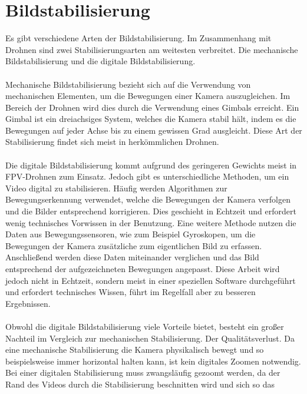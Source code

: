 
\section[Bildstabilisierung]{Bildstabilisierung}
    Es gibt verschiedene Arten der Bildstabilisierung. Im Zusammenhang mit Drohnen sind zwei
    Stabilisierungsarten am weitesten verbreitet. Die mechanische Bildstabilisierung und die
    digitale Bildstabilisierung. \\
    \\
    Mechanische Bildstabilisierung bezieht sich auf die Verwendung von mechanischen Elementen,
    um die Bewegungen einer Kamera auszugleichen. Im Bereich der Drohnen wird dies durch die
    Verwendung eines Gimbals erreicht. Ein Gimbal ist ein dreiachsiges System, welches die Kamera
    stabil hält, indem es die Bewegungen auf jeder Achse bis zu einem gewissen Grad ausgleicht.
    Diese Art der Stabilisierung findet sich meist in herkömmlichen Drohnen. \\
    \\
    Die digitale Bildstabilisierung kommt aufgrund des geringeren Gewichts meist in FPV-Drohnen
    zum Einsatz. Jedoch gibt es unterschiedliche Methoden, um ein Video digital zu stabilisieren.
    Häufig werden Algorithmen zur Bewegungserkennung verwendet, welche die Bewegungen der Kamera
    verfolgen und die Bilder entsprechend korrigieren. Dies geschieht in Echtzeit und erfordert
    wenig technisches Vorwissen in der Benutzung. Eine weitere Methode nutzen die Daten aus
    Bewegungssensoren, wie zum Beispiel Gyroskopen, um die Bewegungen der Kamera zusätzliche
    zum eigentlichen Bild zu erfassen. Anschließend werden diese Daten miteinander verglichen
    und das Bild entsprechend der aufgezeichneten Bewegungen angepasst. Diese Arbeit wird jedoch
    nicht in Echtzeit, sondern meist in einer speziellen Software durchgeführt und erfordert
    technisches Wissen, führt im Regelfall aber zu besseren Ergebnissen. \\
    \\
    Obwohl die digitale Bildstabilisierung viele Vorteile bietet, besteht ein großer Nachteil
    im Vergleich zur mechanischen Stabilisierung. Der Qualitätsverlust. Da eine mechanische
    Stabilisierung die Kamera physikalisch bewegt und so beispielsweise immer horizontal halten kann,
    ist kein digitales Zoomen notwendig. Bei einer digitalen Stabilisierung muss zwangsläufig gezoomt
    werden, da der Rand des Videos durch die Stabilisierung beschnitten wird und sich so das
